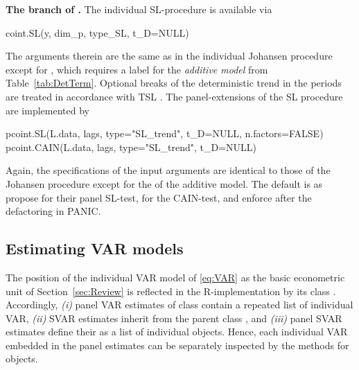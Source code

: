 \textbf{The branch of \citeauthor{SaikkonenLutkepohl2000}.} The individual SL-procedure is available via
\begin{CodeChunk}
\begin{CodeInput}
coint.SL(y, dim_p, type_SL, t_D=NULL)
\end{CodeInput}
\end{CodeChunk}
The arguments therein are the same as in the individual Johansen procedure except for , which requires a label for the \textit{additive model} from Table~\ref{tab:DetTerm}. Optional breaks of the deterministic trend in the periods   are treated in accordance with TSL \citeyearpar{TrenklerEtAl2008}. The panel-extensions of the SL procedure are implemented by
\begin{CodeChunk}
\begin{CodeInput}
pcoint.SL(L.data,   lags, type="SL_trend", t_D=NULL, n.factors=FALSE)
pcoint.CAIN(L.data, lags, type="SL_trend", t_D=NULL)
\end{CodeInput}
\end{CodeChunk}
Again, the specifications of the input arguments are identical to those of the Johansen procedure  except for the  of the additive model. The default is  as \citet{OersalDroge2014} propose for their panel SL-test, \citet{ArsovaOersal2020} for the CAIN-test, and \citeauthor{ArsovaOersal2017} \citeyearpar{ArsovaOersal2017,ArsovaOersal2018} enforce after the defactoring in PANIC.


\subsection{Estimating VAR models} \label{sec:pvarx}
The position of the individual VAR model of \eqref{eq:VAR} as the basic econometric unit of Section~\ref{sec:Review} is reflected in the \textsf{R}-implementation by its class . Accordingly, \textit{(i)} panel VAR estimates of class  contain a repeated list  of individual VAR, \textit{(ii)} SVAR estimates  inherit from the parent class , and \textit{(iii)} panel SVAR estimates  define their  as a list of individual  objects. Hence, each individual VAR embedded in the panel estimates can be separately inspected by the methods for  objects.


